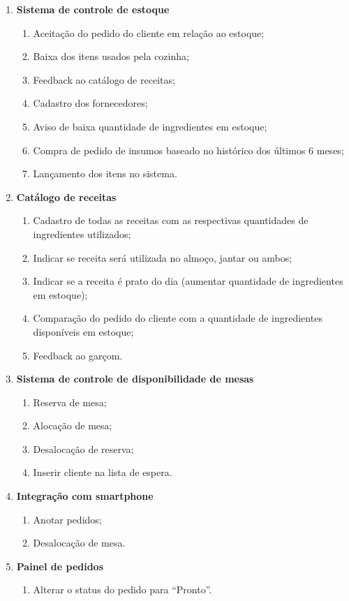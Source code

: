 \begin{enumerate}
\item \textbf{Sistema de controle de estoque}

\begin{enumerate}
  \item Aceitação do pedido do cliente em relação ao estoque;
  \item Baixa dos itens usados pela cozinha;
  \item Feedback ao catálogo de receitas;
  \item Cadastro dos fornecedores;
  \item Aviso de baixa quantidade de ingredientes em estoque;
  \item Compra de pedido de insumos baseado no histórico dos últimos 6 meses;
  \item Lançamento dos itens no sistema.
\end{enumerate}

\item \textbf{Catálogo de receitas}

\begin{enumerate}
  \item Cadastro de todas as receitas com as respectivas quantidades de ingredientes utilizados;
  \item Indicar se receita será utilizada no almoço, jantar ou ambos;
  \item Indicar se a receita é prato do dia (aumentar quantidade de ingredientes em estoque);
  \item Comparação do pedido do cliente com a quantidade de ingredientes disponíveis em estoque;
  \item Feedback ao garçom.
\end{enumerate}

\item \textbf{Sistema de controle de disponibilidade de mesas}

\begin{enumerate}
  \item Reserva de mesa;
  \item Alocação de mesa;
  \item Desalocação de reserva;
  \item Inserir cliente na lista de espera.
\end{enumerate}

\item \textbf{Integração com smartphone}

\begin{enumerate}
  \item Anotar pedidos;
  \item Desalocação de mesa.
\end{enumerate}

\item \textbf{Painel de pedidos}

\begin{enumerate}
  \item Alterar o status do pedido para “Pronto”.
\end{enumerate}
\end{enumerate}

